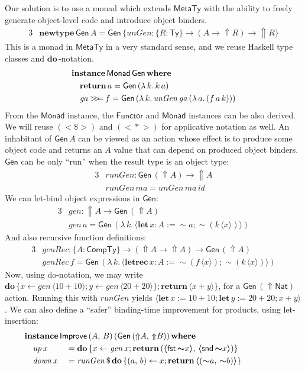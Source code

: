 \documentclass[acmsmall,screen,review,anonymous]{acmart}
\newcommand{\mit}[1]{\mathit{#1}}
\newcommand{\msf}[1]{\mathsf{#1}}
\newcommand{\mbf}[1]{\mathbf{#1}}
\newcommand{\bs}[1]{\boldsymbol{#1}}
\newcommand{\mdo}{\mbf{do}\,}
\newcommand{\ind}{\hspace{1em}}
\newcommand{\return}{\mbf{return}\,}
\newcommand{\lam}{\lambda\,}
\newcommand{\where}{\mbf{where}}
\newcommand{\letrec}{\mbf{letrec}\,}
\newcommand{\letdef}{\mbf{let\,}}
\newcommand{\vma}{\mit{ma}}
\newcommand{\Monad}{\msf{Monad}}
\newcommand{\Applicative}{\msf{Monad}}
\newcommand{\Functor}{\msf{Functor}}
\newcommand{\fro}{\leftarrow}
\newcommand{\Up}{{\Uparrow}}
\newcommand{\spl}{{\bs{\sim}}}
\newcommand{\ql}{{\bs{\langle}}}
\newcommand{\qr}{{\bs{\rangle}}}
\newcommand{\bind}{\mathbin{>\!\!>\mkern-6.7mu=}}
\newcommand{\MTy}{\msf{MetaTy}}
\newcommand{\Ty}{\msf{Ty}}
\newcommand{\CTy}{\msf{CompTy}}
\newcommand{\fst}{\msf{fst}}
\newcommand{\snd}{\msf{snd}}
\newcommand{\Nat}{\msf{Nat}}
\theoremstyle{remark}
\newcommand{\id}{\mit{id}}
\newcommand{\mup}{\mit{up}}
\newcommand{\mdown}{\mit{down}}
\newcommand{\instance}{\mbf{instance}\,}
\newcommand{\Improve}{\msf{Improve}}
\newcommand{\Gen}{\msf{Gen}}
\newcommand{\unGen}{\mit{unGen}}
\newcommand{\gen}{\mit{gen}}
\newcommand{\genRec}{\mit{genRec}}
\newcommand{\fmap}{<\!\!\$\!\!>}
\newcommand{\ap}{<\!\!*\!\!>}
\newcommand{\runGen}{\mit{runGen}}
\newcommand{\qt}[1]{\ql#1\qr}
\newcommand{\newtype}{\mbf{newtype}\,}
\begin{document}
Our solution is to use a monad which extends $\MTy$ with the ability to
freely generate object-level code and introduce object binders.
\begin{alignat*}{3}
  & \newtype \Gen\,A = \Gen\,\{\unGen : \{R : \Ty\} \to (A \to \Up R) \to \Up R\}
\end{alignat*}
This is a monad in $\MTy$ in a very standard sense, and we reuse Haskell type classes
and $\mdo$-notation.
\begin{alignat*}{3}
  &\instance \Monad\,\Gen\,\where\\
  &\ind \return a = \Gen\,(\lam k.\,k\,a)\\
  &\ind \mit{ga} \bind f = \Gen\,(\lam k.\,\unGen\,\mit{ga}\,(\lam a.\,(f\,a\,k)))
\end{alignat*}
From the $\Monad$ instance, the $\Functor$ and $\Applicative$ instances can be also derived.
We will reuse $(\fmap)$ and $(\ap)$ for applicative notation
as well.
An inhabitant of $\Gen\,A$ can be viewed as an action whose effect is to produce
some object code and returns an $A$ value that can depend on produced object
binders. $\Gen$ can be only ``run'' when the result type is an object type:
\begin{alignat*}{3}
  &\runGen : \Gen\,(\Up A) \to \Up A\\
  &\runGen\,\vma = \unGen\,\vma\,\id
\end{alignat*}
We can let-bind object expressions in $\Gen$:
\begin{alignat*}{3}
  & \gen : \Up A \to \Gen\,(\Up A) \\
  & \gen\,a = \Gen\,(\lam k.\,\ql \letdef x : A := \spl a; \spl(k\,\ql x \qr) \qr)
\end{alignat*}
And also recursive function definitions:
\begin{alignat*}{3}
  & \genRec : \{A : \CTy\} \to (\Up A \to \Up A) \to \Gen\,(\Up A) \\
  & \genRec\,f = \Gen\,(\lam k.\,\qt{\letrec x : A := \spl(f\,\qt{x}); \spl(k\,\qt{x})})
\end{alignat*}
Now, using do-notation, we may write $\mdo \{x \fro \gen\,\qt{10 + 10}; y \fro
\gen\,\qt{20 + 20}\};\return \qt{x + y}\}$, for a $\Gen\,(\Up \Nat)$
action. Running this with $\runGen$ yields $\qt{\letdef x := 10 + 10; \letdef y
  := 20 + 20; x + y}$. We can also define a ``safer'' binding-time improvement for
products, using let-insertion:
\begin{alignat*}{3}
  &\hspace{-4em}\mathrlap{\instance \Improve\,(A,\,B)\,(\Gen\,(\Up A,\,\Up B))\,\where}\\
  &\hspace{-4em}\ind \mup\,x   && = \mdo\{x \fro \gen\,x; \return (\qt{\fst\,\spl x},\,\qt{\snd\,\spl x})\}\\
  &\hspace{-4em}\ind \mdown\,x && = \runGen\,\$\,\mdo \{(a,\,b) \fro x; \return \qt{(\spl a,\, \spl b)}\}
\end{alignat*}
\end{document}
